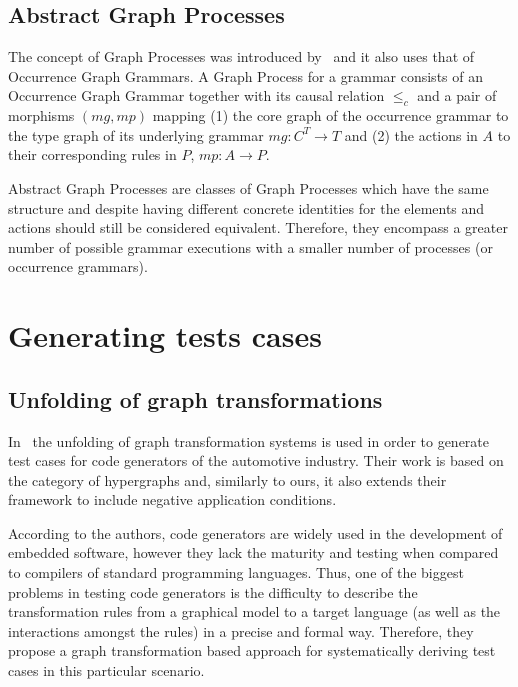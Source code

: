 \subsection{Abstract Graph Processes}

The concept of Graph Processes was introduced by~\cite{Corradini1996} and it also uses that of Occurrence Graph Grammars. A Graph Process for a grammar \graphGrammar{} consists of an Occurrence Graph Grammar \occurrenceGrammar{} together with its causal relation $\leq_c$ and a pair of morphisms $(mg,mp)$ mapping (1) the core graph of the occurrence grammar to the type graph of its underlying grammar $mg: C^T \rightarrow T$ and (2) the actions in $A$ to their corresponding rules in $P$, $mp: A
\rightarrow P$.

Abstract Graph Processes are classes of Graph Processes which have the same structure and despite having different concrete identities for the elements and actions should still be considered equivalent. Therefore, they encompass a greater number of possible grammar executions with a smaller number of processes (or occurrence grammars).


\section{Generating tests cases}

\subsection{Unfolding of graph transformations}

  In~\cite{Baldan2004} the unfolding of graph transformation systems is used in order to generate test cases for code generators of the automotive industry.
  Their work is based on the category of hypergraphs and, similarly to ours, it also extends their framework to include negative application conditions.

  According to the authors, code generators are widely used in the development of embedded software, however they lack the maturity and testing when compared to compilers of standard programming languages.
  Thus, one of the biggest problems in testing code generators is the difficulty to describe the transformation rules from a graphical model to a target language (as well as the interactions amongst the rules) in a precise and formal way.
  Therefore, they propose a graph transformation based approach for systematically deriving test cases in this particular scenario.

